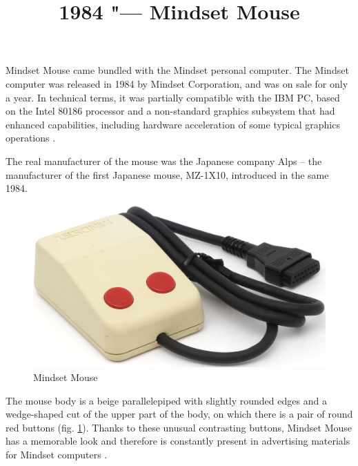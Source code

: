 \documentclass[11pt, a4paper]{article}
\begin{document}
\title{1984 "--- Mindset Mouse}
\date{}
\maketitle
{}

Mindset Mouse came bundled with the Mindset personal computer. The Mindset computer was released in 1984 by Mindset Corporation, and was on sale for only a year. In technical terms, it was partially compatible with the IBM PC, based on the Intel 80186 processor and a non-standard graphics subsystem that had enhanced capabilities, including hardware acceleration of some typical graphics operations \cite{byteMagazine}.

The real manufacturer of the mouse was the Japanese company Alps -- the manufacturer of the first Japanese mouse, MZ-1X10, introduced in the same 1984.

\begin{figure}[h]
   \centering
    \includegraphics[scale=0.6]{1984_mindset_mouse/pic_30.jpg}
    \caption{Mindset Mouse}
    \label{fig:MindsetMousePic}
\end{figure}

The mouse body is a beige parallelepiped with slightly rounded edges and a wedge-shaped cut of the upper part of the body, on which there is a pair of round red buttons (fig. \ref{fig:MindsetMousePic}). Thanks to these unusual contrasting buttons, Mindset Mouse has a memorable look and therefore is constantly present in advertising materials for Mindset computers \cite{adv}.
\end{document}
